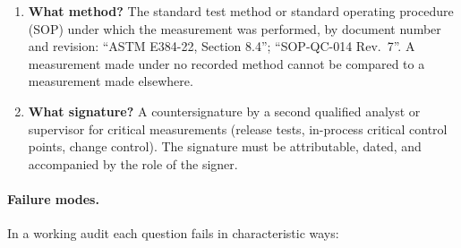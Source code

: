 \begin{enumerate}[leftmargin=*]
  \item \textbf{What method?} The standard test method or
    standard operating procedure (SOP) under which the
    measurement was performed, by document number and revision:
    ``ASTM E384-22, Section 8.4''; ``SOP-QC-014 Rev.\ 7''. A
    measurement made under no recorded method cannot be compared
    to a measurement made elsewhere.

  \item \textbf{What signature?} A countersignature by a second
    qualified analyst or supervisor for critical measurements
    (release tests, in-process critical control points, change
    control). The signature must be attributable, dated, and
    accompanied by the role of the signer.
\end{enumerate}

\paragraph{Failure modes.} In a working audit each question fails
in characteristic ways:


